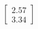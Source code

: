 \documentclass[preview]{standalone}
\begin{document}
\begin{align*}
\begin{bmatrix} 2.57 \\ 3.34 \end{bmatrix}
\end{align*}
\end{document}
